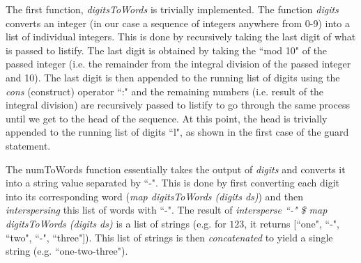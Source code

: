 \documentclass[a4paper, 11pt]{article}
\begin{document}
The first function, \textit{digitsToWords} is trivially implemented. The function \textit{digits} converts an integer (in our case a sequence of integers anywhere from 0-9) into a list of individual integers. This is done by recursively taking the last digit of what is passed to listify. The last digit is obtained by taking the ``mod 10" of the passed integer (i.e. the remainder from the integral division of the passed integer and 10). The last digit is then appended to the running list of digits using the \textit{cons} (construct) operator ``:" and the remaining numbers (i.e. result of the integral division) are recursively passed to listify to go through the same process until we get to the head of the sequence. At this point, the head is trivially appended to the running list of digits ``l", as shown in the first case of the guard statement.

The numToWords function essentially takes the output of \textit{digits} and converts it into a string value separated by ``-". This is done by first converting each digit into its corresponding word (\textit{map digitsToWords (digits ds)}) and then \textit{interspersing} this list of words with ``-". The result of \textit{intersperse ``-" \$ map digitsToWords (digits ds)} is a list of strings (e.g. for $123$, it returns [``one", ``-", ``two", ``-", ``three"]). This list of strings is then \textit{concatenated} to yield a single string (e.g. ``one-two-three").
\end{document}
